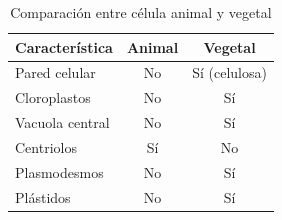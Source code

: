 \begin{table}[h]
\centering
\begin{tabular}{|l|c|c|}
\hline
\textbf{Característica} & \textbf{Animal} & \textbf{Vegetal} \\
\hline
Pared celular & No & Sí (celulosa) \\
\hline
Cloroplastos & No & Sí \\
\hline
Vacuola central & No & Sí \\
\hline
Centriolos & Sí & No \\
\hline
Plasmodesmos & No & Sí \\
\hline
Plástidos & No & Sí \\
\hline
\end{tabular}
\caption{Comparación entre célula animal y vegetal}
\end{table}
